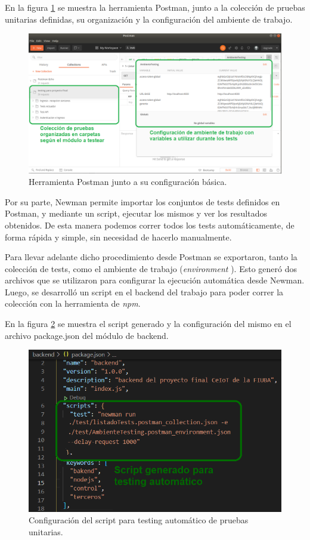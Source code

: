 En la figura \ref{fig:Postmanconfig} se muestra la herramienta Postman, junto a la colección de pruebas unitarias definidas, su organización y la configuración del ambiente de trabajo.


\begin{figure}[ht]
	\centering
	\includegraphics[width=1\textwidth]{./Figures/postman.png}
	\caption{Herramienta Postman junto a su configuración básica.}
	\label{fig:Postmanconfig}
\end{figure}

Por su parte, Newman permite importar los conjuntos de tests definidos en Postman, y mediante un script, ejecutar los mismos y ver los resultados obtenidos. De esta manera podemos correr todos los tests automáticamente, de forma rápida y simple, sin necesidad de hacerlo manualmente.

Para llevar adelante dicho procedimiento desde Postman se exportaron, tanto la colección de tests, como el ambiente de trabajo (\textit{environment} \citep{WEBSITE:EnvironmentPostman}). Esto generó dos archivos que se utilizaron para configurar la ejecución automática desde Newman. Luego, se desarrolló un script en el backend del trabajo para poder correr la colección con la herramienta de \textit{npm}.

En la figura \ref{fig:scriptNewman} se muestra el script generado y la configuración del mismo en el archivo package.json del módulo de backend.


\begin{figure}[ht]
	\centering
	\includegraphics[width=1\textwidth]{./Figures/scriptNewman.png}
	\caption{Configuración del script para testing automático de pruebas unitarias.}
	\label{fig:scriptNewman}
\end{figure}

